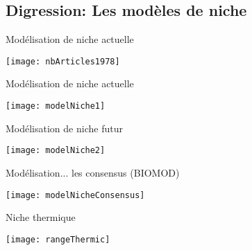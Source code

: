 \documentclass[]{beamer}
\begin{document}
\subsection{Digression: Les modèles de niche}

\begin{frame}{Modélisation de niche actuelle}
  \begin{center}
    \texttt{[image: nbArticles1978]}
  \end{center}
\end{frame}


\begin{frame}{Modélisation de niche actuelle}
  \begin{center}
    \texttt{[image: modelNiche1]}
  \end{center}
\end{frame}

\begin{frame}{Modélisation de niche futur}
  \begin{center}
    \texttt{[image: modelNiche2]}
  \end{center}
\end{frame}


\begin{frame}{Modélisation... les consensus (BIOMOD)}
  \begin{center}
    \texttt{[image: modelNicheConsensus]}
  \end{center}
\end{frame}

\begin{frame}{Niche thermique}
  \begin{center}
    \texttt{[image: rangeThermic]}
  \end{center}

\end{frame}
\end{document}
